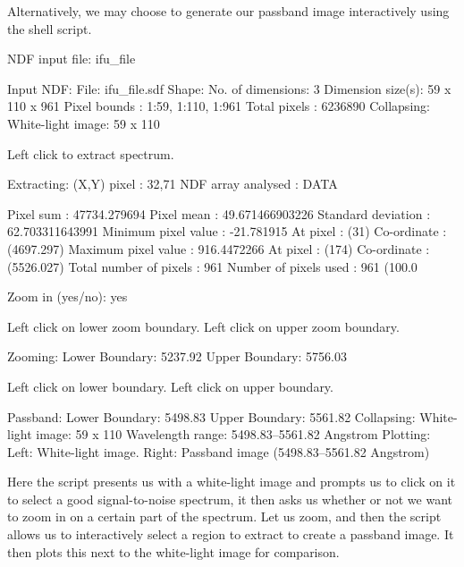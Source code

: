 \documentclass[twoside,11pt]{starlink}
\begin{document}
Alternatively, we may choose to generate our passband image
interactively using the  shell
script.

\begin{small}
\begin{terminalv}
NDF input file: ifu_file

     Input NDF:
       File: ifu_file.sdf
     Shape:
       No. of dimensions: 3
       Dimension size(s): 59 x 110 x 961
       Pixel bounds     : 1:59, 1:110, 1:961
       Total pixels     : 6236890
     Collapsing:
       White-light image: 59 x 110

 Left click to extract spectrum.

     Extracting:
       (X,Y) pixel             : 32,71
     NDF array analysed        : DATA

        Pixel sum              : 47734.279694
        Pixel mean             : 49.671466903226
        Standard deviation     : 62.703311643991
        Minimum pixel value    : -21.781915
           At pixel            : (31)
           Co-ordinate         : (4697.297)
        Maximum pixel value    : 916.4472266
           At pixel            : (174)
           Co-ordinate         : (5526.027)
        Total number of pixels : 961
        Number of pixels used  : 961 (100.0%


Zoom in (yes/no): yes

 Left click on lower zoom boundary.
 Left click on upper zoom boundary.

     Zooming:
       Lower Boundary: 5237.92
       Upper Boundary: 5756.03

 Left click on lower boundary.
 Left click on upper boundary.

     Passband:
       Lower Boundary: 5498.83
       Upper Boundary: 5561.82
     Collapsing:
       White-light image: 59 x 110
       Wavelength range: 5498.83--5561.82 Angstrom
     Plotting:
       Left: White-light image.
       Right: Passband image (5498.83--5561.82 Angstrom)
%
\end{terminalv}
\end{small}

Here the script presents us with a white-light image and prompts us to
click on it to select a good signal-to-noise spectrum, it then asks us
whether or not we want to zoom in on a certain part of the spectrum.
Let us zoom, and then the script allows us to interactively select a
region to extract to create a passband image.  It then plots this next
to the white-light image for comparison.
\end{document}
